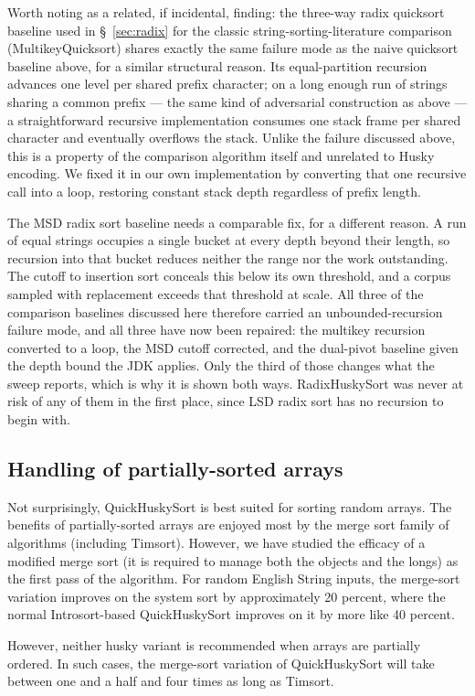 \documentclass[twoside,leqno,twocolumn]{article}
\begin{document}
Worth noting as a related, if incidental, finding:
the three-way radix quicksort baseline used in \S~\ref{sec:radix} for the classic string-sorting-literature comparison (MultikeyQuicksort)
shares exactly the same failure mode as the naive quicksort baseline above, for a similar structural reason.
Its equal-partition recursion advances one level per shared prefix character;
on a long enough run of strings sharing a common prefix — the same kind of adversarial construction as above —
a straightforward recursive implementation consumes one stack frame per shared character and eventually overflows the stack.
Unlike the failure discussed above, this is a property of the comparison algorithm itself and unrelated to Husky encoding.
We fixed it in our own implementation by converting that one recursive call into a loop,
restoring constant stack depth regardless of prefix length.

The MSD radix sort baseline needs a comparable fix, for a different reason.
A run of equal strings occupies a single bucket at every depth beyond their length,
so recursion into that bucket reduces neither the range nor the work outstanding.
The cutoff to insertion sort conceals this below its own threshold,
and a corpus sampled with replacement exceeds that threshold at scale.
All three of the comparison baselines discussed here therefore carried an unbounded-recursion failure mode,
and all three have now been repaired: the multikey recursion converted to a loop, the MSD cutoff corrected,
and the dual-pivot baseline given the depth bound the JDK applies.
Only the third of those changes what the sweep reports, which is why it is shown both ways.
RadixHuskySort was never at risk of any of them in the first place,
since LSD radix sort has no recursion to begin with.

\subsection{Handling of partially-sorted arrays}

Not surprisingly, QuickHuskySort is best suited for sorting random arrays.
The benefits of partially-sorted arrays are enjoyed most by the merge sort family of algorithms (including Timsort).
However, we have studied the efficacy of a modified merge sort (it is required to manage both the objects and the longs) as the first pass of the algorithm.
For random English String inputs,
the merge-sort variation improves on the system sort by approximately 20 percent, where the normal Introsort-based QuickHuskySort improves on it by more like 40 percent.

However, neither husky variant is recommended when arrays are partially ordered.
In such cases, the merge-sort variation of QuickHuskySort will take between one and a half and four times as long as Timsort.
\end{document}
